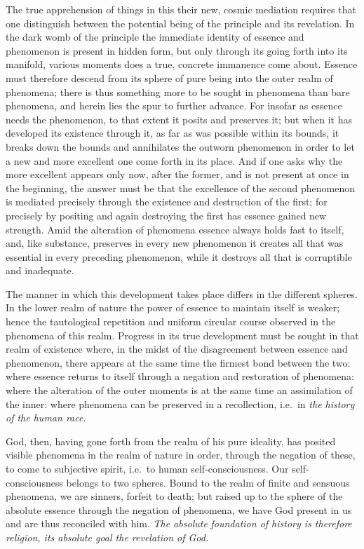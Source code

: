 \documentclass[12pt]{book}
\newcommand{\opage}[1]{\marginnote{\footnotesize\textit{[#1]}}}
\begin{document}
The true apprehension of things in this their new, cosmic mediation requires
that one distinguish between the potential being of the principle and its
revelation. In the dark womb of the principle the immediate identity of
essence and phenomenon is present in hidden form, but only through its going
forth into its manifold, various moments does a true, concrete immanence come
about. Essence must therefore descend from its sphere of pure being into the
outer realm of phenomena; there is thus something more to be sought in
phenomena than bare phenomena, and herein lies the spur to further
advance. For insofar as essence needs the phenomenon, to that extent it
posits and preserves it; but when it has developed its existence through it,
as far as was possible within its bounds, it breaks down the bounds and
annihilates the outworn phenomenon in order to let a new and more excellent
one
\opage{127} come forth in its place. And if one asks why the more excellent appears only
now, after the former, and is not present at once in the beginning, the
answer must be that the excellence of the second phenomenon is mediated
precisely through the existence and destruction of the first; for precisely
by positing and again destroying the first has essence gained new strength.
Amid the alteration of phenomena essence always holds fast to itself, and,
like substance, preserves in every new phenomenon it creates all that was
essential in every preceding phenomenon, while it destroys all that is
corruptible and inadequate.

The manner in which this development takes place differs in the different
spheres. In the lower realm of nature the power of essence to maintain itself
is weaker; hence the tautological repetition and uniform circular course
observed in the phenomena of this realm. Progress in its true development must
be sought in that realm of existence where, in the midst of the disagreement
between essence and phenomenon, there appears at the same time the firmest
bond between the two: where essence returns to itself through a negation and
restoration of phenomena: where the alteration of the outer moments is at the
same time an assimilation of the inner: where phenomena can be preserved in a
recollection, i.e.\ in \emph{the history of the human race}.

God, then, having gone forth from the realm of his pure ideality, has posited
visible phenomena in the realm of nature in order, through the negation of
these, to come to subjective spirit, i.e.\ to human self-consciousness. Our
self-consciousness belongs to two spheres. Bound to the realm of finite and
sensuous phenomena, we are sinners, forfeit to death; but raised up to the
sphere of the absolute essence through the negation of phenomena, we have God
present in us and are thus reconciled with him. \emph{The absolute}
\opage{128} \emph{foundation of history is therefore religion, its absolute goal the
revelation of God.}
\end{document}
